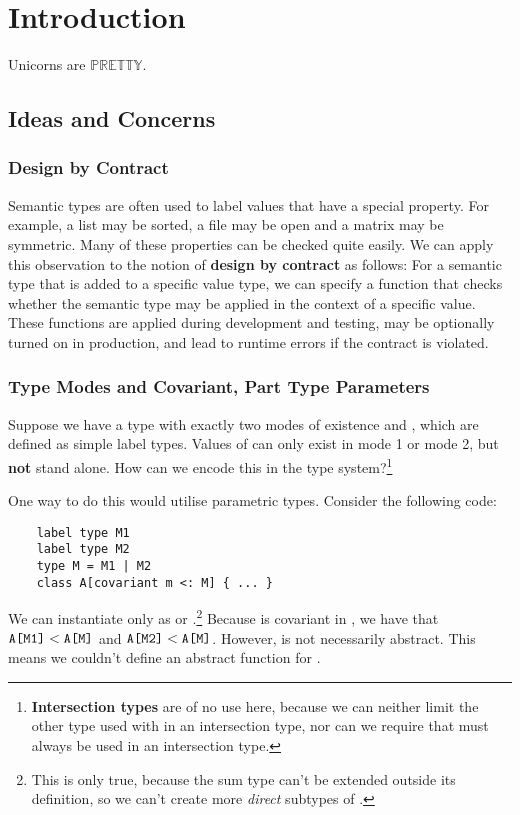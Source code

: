 \chapter{Introduction}

Unicorns are $\mathbb{PRETTY}$.



\section{Ideas and Concerns}

\subsection{Design by Contract}
Semantic types are often used to label values that have a special property. For example, a list may be sorted, a file may be open and a matrix may be symmetric. Many of these properties can be checked quite easily. We can apply this observation to the notion of \textbf{design by contract} as follows: For a semantic type that is added to a specific value type, we can specify a function that checks whether the semantic type may be applied in the context of a specific value. These functions are applied during development and testing, may be optionally turned on in production, and lead to runtime errors if the contract is violated.


\subsection{Type Modes and Covariant, Part Type Parameters}
Suppose we have a type  with exactly two modes of existence  and , which are defined as simple label types. Values of  can only exist in mode 1 or mode 2, but \textbf{not} stand alone. How can we encode this in the type system?\footnote{\textbf{Intersection types} are of no use here, because we can neither limit the other type used with  in an intersection type, nor can we require that  must always be used in an intersection type.}

One way to do this would utilise parametric types. Consider the following code:

\begin{lstlisting}
    label type M1
    label type M2
    type M = M1 | M2
    class A[covariant m <: M] { ... }
\end{lstlisting}

We can instantiate  only as  or .\footnote{This is only true, because the sum type can't be extended outside its definition, so we can't create more \textit{direct} subtypes of .} Because  is covariant in , we have that $\texttt{A[M1]} < \texttt{A[M]}$ and $\texttt{A[M2]} < \texttt{A[M]}$. However,  is not necessarily abstract. This means we couldn't define an abstract function for . 

